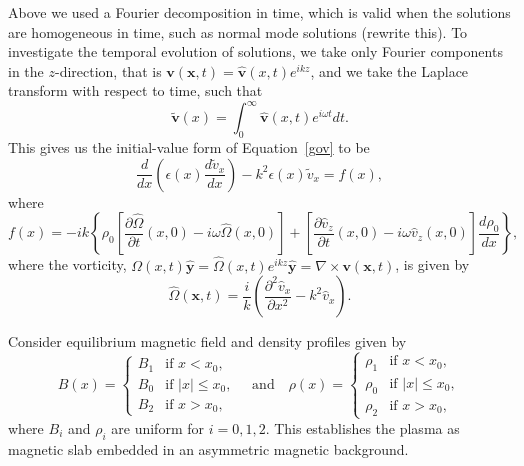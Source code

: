 \documentclass{aastex61}
\begin{document}
Above we used a Fourier decomposition in time, which is valid when the solutions are homogeneous in time, such as normal mode solutions (rewrite this). To investigate the temporal evolution of solutions, we take only Fourier components in the $z$-direction, that is $\mathbf{v}(\mathbf{x},t) = \mathbf{\hat{v}}(x,t)e^{ikz}$, and we take the Laplace transform with respect to time, such that
\begin{equation}
\mathbf{\tilde{v}}(x) = \int_0^\infty \mathbf{\widehat{v}}(x,t)e^{i\omega t} dt.
\end{equation}
This gives us the initial-value form of Equation~\eqref{gov} to be
\begin{equation}
\frac{d}{dx}\left(\epsilon(x) \frac{d\tilde{v}_x}{dx}\right) - k^2\epsilon(x)\tilde{v}_x = f(x),
\label{ivp gov}
\end{equation}
where
\begin{equation}
f(x) = -ik\left\{\rho_0\left[\frac{\partial\hat{\Omega}}{\partial t}(x,0) - i\omega\hat{\Omega}(x,0)\right] + \left[\frac{\partial\hat{v}_z}{\partial t}(x,0) - i\omega \hat{v}_z(x,0)\right]\frac{d\rho_0}{dx}\right\},
\label{f}
\end{equation}
where the vorticity, $\Omega(x,t)\mathbf{\hat{y}} = \hat{\Omega}(x,t)e^{ikz}\mathbf{\hat{y}} = \nabla \times \mathbf{v}(\mathbf{x},t)$, is given by
\begin{equation}
\hat{\Omega}(\mathbf{x},t) = \frac{i}{k}\left(\frac{\partial^2\hat{v}_x}{\partial x^2} - k^2 \hat{v}_x\right).
\end{equation}

Consider equilibrium magnetic field and density profiles given by
\begin{equation}
B(x)=
\begin{cases}
B_1 & \text{if  }x<x_0, \\
B_0 & \text{if }|x|\leq{x_0}, \\
B_2 & \text{if  }x>x_0,
\end{cases}
\quad \text{and} \quad
\rho(x)=
\begin{cases}
\rho_1 & \text{if  }x<x_0, \\
\rho_0 & \text{if }|x|\leq{x_0}, \\
\rho_2 & \text{if  }x>x_0,
\end{cases}
\end{equation}
where $B_i$ and $\rho_i$ are uniform for $i = 0,1,2$. This establishes the plasma as magnetic slab embedded in an asymmetric magnetic background.
\end{document}
